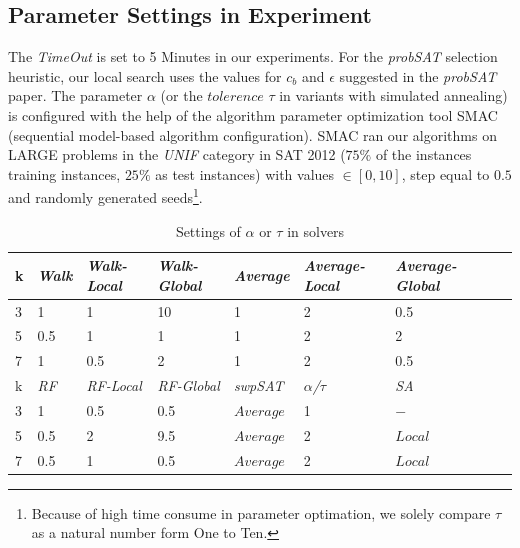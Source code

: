 \documentclass[12pt,a4paper,twoside]{scrartcl}
\numberwithin{equation}{section}
\begin{document}
\subsection{Parameter Settings in Experiment}
The \emph{TimeOut} is set to 5 Minutes in our experiments.  For the \emph{probSAT} selection heuristic, our local search uses the values for $c_b$ and $\epsilon$ suggested in the \emph{probSAT} paper.  The parameter $\alpha$ (or the $tolerence$ $ \tau$ in variants with simulated annealing) is  configured with the help of the algorithm parameter optimization tool SMAC \cite{SMAC} (sequential model-based algorithm configuration). SMAC ran our algorithms on LARGE problems in the \emph{UNIF} category in SAT 2012 ($75\%$ of the instances training instances,  $25\%$ as test instances) with values $\in [0, 10]$, step equal to $0.5$ and randomly generated seeds\footnote{Because of high time consume in parameter optimation, we solely compare $\tau$  as a natural number form One to Ten.}.
   \begin{table}[H]
\begin{center}
    \begin{tabular}{|l|l|l|l||l|l|l|l|p{1cm}|}
\hline 

    k &\emph{Walk}&\emph{Walk-Local}&\emph{Walk-Global}&\emph{Average}&\emph{Average-Local}&\emph{Average-Global} \\ \hline
    3 & 1& 1 & 10 &  1 & 2& 0.5       \\ \hline  
    5 & 0.5& 1 & 1&  1 & 2& 2 \\ \hline  
    7 & 1& 0.5 & 2&  1 & 2& 0.5  \\ \hline  
 \hline  
    k &\emph{RF}&\emph{RF-Local}&\emph{RF-Global}&\emph{swpSAT}&\emph{$\alpha$/$\tau$}&\emph{SA} \\ \hline  
    3 & 1& 0.5 & 0.5&$Average$ & 1 & $-$\\ \hline 
    5 & 0.5& 2& 9.5&$Average$& 2 & $Local$\\ \hline 
    7 & 0.5& 1& 0.5 &$Average$&2 & $Local$\\ \hline 

	
\end{tabular}
\caption{Settings of $\alpha$ or $\tau$ in solvers}
\end{center}
\end{table}
\end{document}
